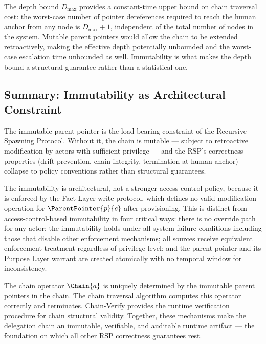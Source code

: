 The depth bound $D_{\max}$ provides a constant-time upper bound on chain traversal cost: the worst-case number of pointer dereferences required to reach the human anchor from any node is $D_{\max} + 1$, independent of the total number of nodes in the system. Mutable parent pointers would allow the chain to be extended retroactively, making the effective depth potentially unbounded and the worst-case escalation time unbounded as well. Immutability is what makes the depth bound a structural guarantee rather than a statistical one.

\subsection{Summary: Immutability as Architectural Constraint}
\label{sec:immutability-summary}

The immutable parent pointer is the load-bearing constraint of the Recursive Spawning Protocol. Without it, the chain is mutable --- subject to retroactive modification by actors with sufficient privilege --- and the RSP's correctness properties (drift prevention, chain integrity, termination at human anchor) collapse to policy conventions rather than structural guarantees.

The immutability is architectural, not a stronger access control policy, because it is enforced by the Fact Layer write protocol, which defines no valid modification operation for $\ParentPointer{p}{c}$ after provisioning. This is distinct from access-control-based immutability in four critical ways: there is no override path for any actor; the immutability holds under all system failure conditions including those that disable other enforcement mechanisms; all sources receive equivalent enforcement treatment regardless of privilege level; and the parent pointer and its Purpose Layer warrant are created atomically with no temporal window for inconsistency.

The chain operator $\Chain{a}$ is uniquely determined by the immutable parent pointers in the chain. The chain traversal algorithm computes this operator correctly and terminates. Chain-Verify provides the runtime verification procedure for chain structural validity. Together, these mechanisms make the delegation chain an immutable, verifiable, and auditable runtime artifact --- the foundation on which all other RSP correctness guarantees rest.